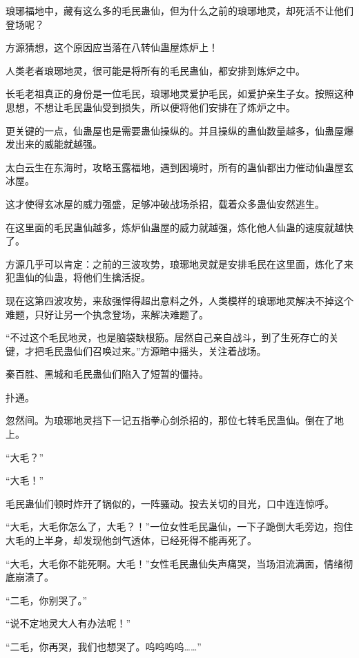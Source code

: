 
\begin{this_body}

琅琊福地中，藏有这么多的毛民蛊仙，但为什么之前的琅琊地灵，却死活不让他们登场呢？

方源猜想，这个原因应当落在八转仙蛊屋炼炉上！

人类老者琅琊地灵，很可能是将所有的毛民蛊仙，都安排到炼炉之中。

长毛老祖真正的身份是一位毛民，琅琊地灵爱护毛民，如爱护亲生子女。按照这种思想，不想让毛民蛊仙受到损失，所以便将他们安排在了炼炉之中。

更关键的一点，仙蛊屋也是需要蛊仙操纵的。并且操纵的蛊仙数量越多，仙蛊屋爆发出来的威能就越强。

太白云生在东海时，攻略玉露福地，遇到困境时，所有的蛊仙都出力催动仙蛊屋玄冰屋。

这才使得玄冰屋的威力强盛，足够冲破战场杀招，载着众多蛊仙安然逃生。

在这里面的毛民蛊仙越多，炼炉仙蛊屋的威力就越强，炼化他人仙蛊的速度就越快了。

方源几乎可以肯定：之前的三波攻势，琅琊地灵就是安排毛民在这里面，炼化了来犯蛊仙的仙蛊，将他们生擒活捉。

现在这第四波攻势，来敌强悍得超出意料之外，人类模样的琅琊地灵解决不掉这个难题，只好让另一个执念登场，来解决难题了。

“不过这个毛民地灵，也是脑袋缺根筋。居然自己亲自战斗，到了生死存亡的关键，才把毛民蛊仙们召唤过来。”方源暗中摇头，关注着战场。

秦百胜、黑城和毛民蛊仙们陷入了短暂的僵持。

扑通。

忽然间。为琅琊地灵挡下一记五指拳心剑杀招的，那位七转毛民蛊仙。倒在了地上。

“大毛？”

“大毛！”

毛民蛊仙们顿时炸开了锅似的，一阵骚动。投去关切的目光，口中连连惊呼。

“大毛，大毛你怎么了，大毛？！”一位女性毛民蛊仙，一下子跪倒大毛旁边，抱住大毛的上半身，却发现他剑气透体，已经死得不能再死了。

“大毛，大毛你不能死啊。大毛！”女性毛民蛊仙失声痛哭，当场泪流满面，情绪彻底崩溃了。

“二毛，你别哭了。”

“说不定地灵大人有办法呢！”

“二毛，你再哭，我们也想哭了。呜呜呜呜……”


\end{this_body}
